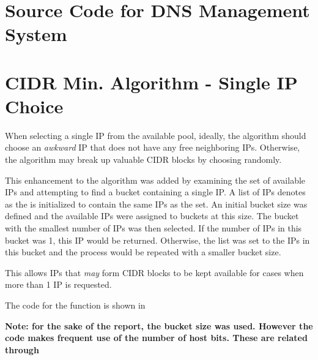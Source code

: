 \begin{appendices}

\chapter{Source Code for DNS Management System}
\label{appendix:dnsManagement}






\chapter{CIDR Min. Algorithm - Single IP Choice}
\label{appendix:smartSingleIP}
When selecting a single IP from the available pool, ideally, the algorithm should choose an \textit{awkward} IP that does not have any free neighboring IPs. Otherwise, the algorithm may break up valuable CIDR blocks by choosing randomly. 

This enhancement to the algorithm was added by examining the set of available IPs and attempting to find a bucket containing a single IP. A list of IPs denotes as the  is initialized to contain the same IPs as the  set. An initial bucket size was defined and the available IPs were assigned to buckets at this size. The bucket with the smallest number of IPs was then selected. If the number of IPs in this bucket was 1, this IP would be returned. Otherwise, the  list was set to the IPs in this bucket and the process would be repeated with a smaller bucket size. 

This allows IPs that \textit{may} form CIDR blocks to be kept available for cases when more than 1 IP is requested. 

The code for the function is shown in 

\textbf{Note: for the sake of the report, the bucket size was used. However the code makes frequent use of the number of host bits. These are related through }


\end{appendices}
